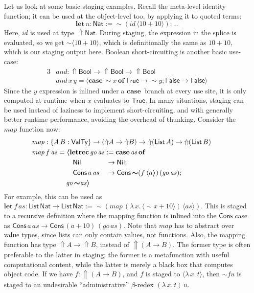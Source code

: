 \documentclass[acmsmall,screen,review,anonymous]{acmart}
\newcommand{\mit}[1]{\mathit{#1}}
\newcommand{\msf}[1]{\mathsf{#1}}
\newcommand{\mbf}[1]{\mathbf{#1}}
\newcommand{\bs}[1]{\boldsymbol{#1}}
\newcommand{\ind}{\hspace{1em}}
\newcommand{\lam}{\lambda\,}
\newcommand{\letrec}{\mbf{letrec}\,}
\newcommand{\of}{\mbf{of}\,}
\newcommand{\go}{\mit{go}}
\newcommand{\letdef}{\mbf{let\,}}
\newcommand{\map}{\mit{map}}
\newcommand{\vas}{\mit{as}}
\newcommand{\List}{\msf{List}\,}
\newcommand{\Nil}{\msf{Nil}}
\newcommand{\Cons}{\msf{Cons}}
\newcommand{\Bool}{\msf{Bool}}
\newcommand{\case}{\mbf{case\,}}
\newcommand{\Lift}{{\Uparrow}}
\newcommand{\Up}{{\Uparrow}}
\newcommand{\spl}{{\bs{\sim}}}
\newcommand{\ql}{{\bs{\langle}}}
\newcommand{\qr}{{\bs{\rangle}}}
\newcommand{\VTy}{\msf{ValTy}}
\newcommand{\True}{\msf{True}}
\newcommand{\False}{\msf{False}}
\newcommand{\Nat}{\msf{Nat}}
\theoremstyle{remark}
\newcommand{\id}{\mit{id}}
\newcommand{\qt}[1]{\ql#1\qr}
\begin{document}
Let us look at some basic staging examples. Recall the meta-level identity
function; it can be used at the object-level too, by applying it to quoted
terms:
  \[ \letdef n : \Nat := \spl(\id\,\ql 10 + 10 \qr); ... \]
Here, $\id$ is used at type $\Lift \Nat$. During staging, the expression in the
splice is evaluated, so we get $\spl\ql 10 + 10 \qr$, which is definitionally
the same as $10 + 10$, which is our staging output here. Boolean
short-circuiting is another basic use-case:
\begin{alignat*}{3}
  &\mit{and} : \Up\Bool \to \Up\Bool \to \Up\Bool\\
  &\mit{and}\,x\,y = \ql\case \spl x\,\of \True \to \spl y; \False \to \False\qr
\end{alignat*}
Since the $y$ expression is inlined under a $\case$ branch at every use site, it
is only computed at runtime when $x$ evaluates to $\True$. In many situations,
staging can be used instead of laziness to implement short-circuiting, and with
generally better runtime performance, avoiding the overhead of thunking. Consider
the $\map$ function now:
\begin{alignat*}{3}
  & \hspace{-5em}\mathrlap{\map : \{A\,B : \VTy\} \to (\Up A \to \Up B) \to \Up (\List A) \to \Up(\List B)}\\
  & \hspace{-5em}\mathrlap{\map\,f\,\vas = \ql\letrec \go\,\vas := \case \vas\,\of}\\
  & \hspace{-5em}\ind\ind\ind\ind\ind \ind\Nil           &&\to \Nil;\\
  & \hspace{-5em}\ind\ind\ind\ind\ind \ind\Cons\,a\,\vas &&\to \Cons\,\spl(f\,\ql a \qr)\,(\go\,\vas);\\
  & \hspace{-5em}\ind\ind\ind\ind\ind\go\,\spl\vas \qr
\end{alignat*}
For example, this can be used as $\letdef f\,\vas : \List \Nat \to \List \Nat :=
\spl(\map\,(\lam x.\,\ql \spl x + 10 \qr)\,\qt{\vas}) $.  This is staged to a recursive
definition where the mapping function is inlined into the $\Cons$ case as
$\Cons\,a\,\vas \to \Cons\,(a + 10)\,(\go\,\vas)$.  Note that $\map$ has to
abstract over value types, since lists can only contain values, not functions. Also, the
mapping function has type $\Up A \to \Up B$, instead of $\Up (A \to B)$. The
former type is often preferable to the latter in staging; the former is
a metafunction with useful computational content, while the latter is merely a
black box that computes object code. If we have $f : \Up(A \to B)$, and $f$ is
staged to $\ql \lam x.\,t\qr$, then $\spl f u$ is staged to an
undesirable ``administrative'' $\beta$-redex $(\lam x.\,t)\,u$.
\end{document}
